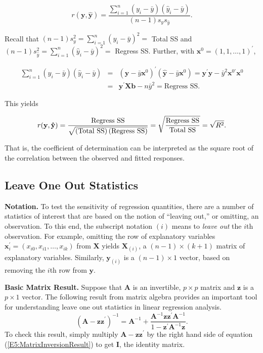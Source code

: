 \begin{center}
\[
r(\mathbf{y,\hat{y}})=\frac{\sum_{i=1}^{n}(y_{i}-\bar{y})(\hat{y}_{i}-\bar{y}%
)}{(n-1)s_{y}s_{\hat{y}}}.
\]
\end{center}
Recall that $(n-1)s_{y}^{2}=\sum_{i=1}^{n}(y_{i}-\bar{y})^{2}=$ Total SS and $%
(n-1)s_{\hat{y}}^{2}=\sum_{i=1}^{n}(\hat{y}_{i}-\bar{y})^{2}=$
Regress SS. Further, with $\mathbf{x}^{0}=(1,1,\ldots,1)^{\prime }$,
\begin{center}
\begin{eqnarray*}
\sum_{i=1}^{n}(y_{i}-\bar{y})(\hat{y}_{i}-\bar{y}) &=&(\mathbf{y}-\bar{y}%
\mathbf{x}^{0})^{\prime }(\mathbf{\hat{y}}-\bar{y}\mathbf{x}^{0})=\mathbf{y}%
^{\prime }\mathbf{\hat{y}}-\bar{y}^{2}\mathbf{x}^{0\prime }\mathbf{x}^{0} \\
&=&\mathbf{y}^{\prime }\mathbf{Xb}-n\bar{y}^{2}=\text{Regress SS.}
\end{eqnarray*}
\end{center}
This yields
\begin{center}
\[
r(\mathbf{y,\hat{y}})=\frac{\text{Regress SS}}{\sqrt{\left( \text{Total SS}%
\right) \left( \text{Regress SS}\right) }}=\sqrt{\frac{\text{Regress SS}}{%
\text{Total SS}}}=\sqrt{R^{2}}.
\]
\end{center}
That is, the coefficient of determination can be interpreted as the
square root of the correlation between the observed and fitted
responses.

\subsection{Leave One Out Statistics}

\textbf{Notation.} To test the sensitivity of regression quantities,
there are a number of statistics of interest that are based on the
notion of ``leaving out,'' or omitting, an observation. To this end,
the subscript notation $(i)$ means to \textit{leave out} the $i$th
observation. For example, omitting the row of explanatory variables
$\mathbf{x}_{i}^{\prime }=(x_{i0},x_{i1},\dots,x_{ik})$ from
$\mathbf{X}$ yields $\mathbf{X}_{(i)}$, a
$(n-1)\times (k+1)$ matrix of explanatory variables. Similarly, $\mathbf{y}%
_{(i)}$ is a $(n-1)\times 1$ vector, based on removing the $i$th row from $%
\mathbf{y}$.

\textbf{Basic Matrix Result.} Suppose that $\mathbf{A}$ is an invertible, $%
p\times p$ matrix and $\mathbf{z}$ is a $p\times 1$ vector. The
following result from matrix algebra provides an important tool for
understanding leave one out statistics in linear regression
analysis.
\begin{equation}\label{E5:MatrixInversionResult}
\left( \mathbf{A-zz}^{\prime }\right) ^{-1}=\mathbf{A}^{-1}+\frac{\mathbf{A}%
^{-1}\mathbf{zz}^{\prime }\mathbf{A}^{-1}}{1-\mathbf{z}^{\prime }\mathbf{A}%
^{-1}\mathbf{z}}.
\end{equation}
To check this result, simply multiply $\mathbf{A-zz}^{\prime }$ by
the right hand side of equation (\ref{E5:MatrixInversionResult}) to
get $\mathbf{I}$, the identity matrix.

